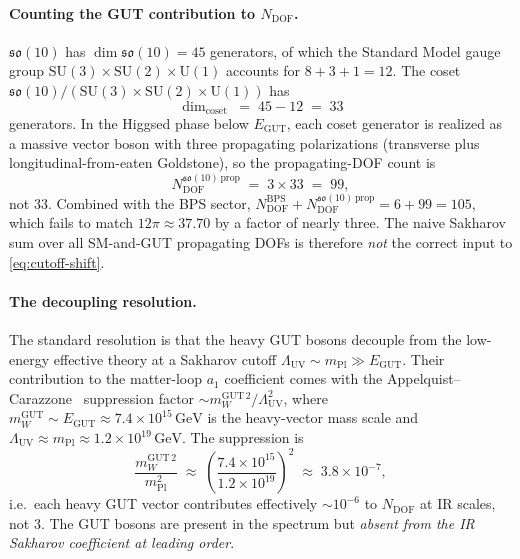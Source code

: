 \documentclass[11pt]{article}
\newcommand{\so}{\mathfrak{so}}
\newcommand{\mPl}{m_{\mathrm{Pl}}}
\newcommand{\SU}{\mathrm{SU}}
\newcommand{\U}{\mathrm{U}}
\newcommand{\GeV}{\mathrm{GeV}}
\begin{document}
\paragraph{Counting the GUT contribution to $N_{\mathrm{DOF}}$.}
$\so(10)$ has $\dim\so(10) = 45$ generators, of which the Standard
Model gauge group $\SU(3) \times \SU(2) \times \U(1)$ accounts for
$8 + 3 + 1 = 12$.  The coset
$\so(10)/(\SU(3) \times \SU(2) \times \U(1))$ has
\begin{equation}
  \dim_{\mathrm{coset}}
   \;=\;
   45 - 12
   \;=\;
   33
\end{equation}
generators.  In the Higgsed phase below $E_{\mathrm{GUT}}$, each
coset generator is realized as a massive vector boson with three
propagating polarizations (transverse plus longitudinal-from-eaten
Goldstone), so the propagating-DOF count is
\begin{equation}
  N_{\mathrm{DOF}}^{\so(10)\,\mathrm{prop}}
   \;=\;
   3 \times 33
   \;=\;
   99,
  \label{eq:N-prop-naive}
\end{equation}
not $33$.  Combined with the BPS sector,
$N_{\mathrm{DOF}}^{\mathrm{BPS}} + N_{\mathrm{DOF}}^{\so(10)\,\mathrm{prop}}
= 6 + 99 = 105$, which fails to match $12\pi \approx 37.70$ by a
factor of nearly three.  The naive Sakharov sum over all
SM-and-GUT propagating DOFs is therefore \emph{not} the correct
input to \eqref{eq:cutoff-shift}.

\paragraph{The decoupling resolution.}
The standard resolution is that the heavy GUT bosons decouple from
the low-energy effective theory at a Sakharov cutoff
$\Lambda_{\mathrm{UV}} \sim \mPl \gg E_{\mathrm{GUT}}$.  Their
contribution to the matter-loop $a_1$ coefficient comes with the
Appelquist--Carazzone~\cite{appelquist1975} suppression factor
$\sim m_W^{\mathrm{GUT}\,2}/\Lambda_{\mathrm{UV}}^2$, where
$m_W^{\mathrm{GUT}} \sim E_{\mathrm{GUT}} \approx
7.4 \times 10^{15}\,\GeV$ is the heavy-vector mass scale and
$\Lambda_{\mathrm{UV}} \approx \mPl \approx 1.2 \times 10^{19}\,\GeV$.
The suppression is
\begin{equation}
  \frac{m_W^{\mathrm{GUT}\,2}}{\mPl^2}
   \;\approx\;
   \left(\frac{7.4 \times 10^{15}}{1.2 \times 10^{19}}\right)^{\!2}
   \;\approx\;
   3.8 \times 10^{-7},
\end{equation}
i.e.\ each heavy GUT vector contributes effectively $\sim 10^{-6}$
to $N_{\mathrm{DOF}}$ at IR scales, not $3$.  The GUT bosons are
present in the spectrum but \emph{absent from the IR Sakharov
coefficient at leading order}.
\end{document}
